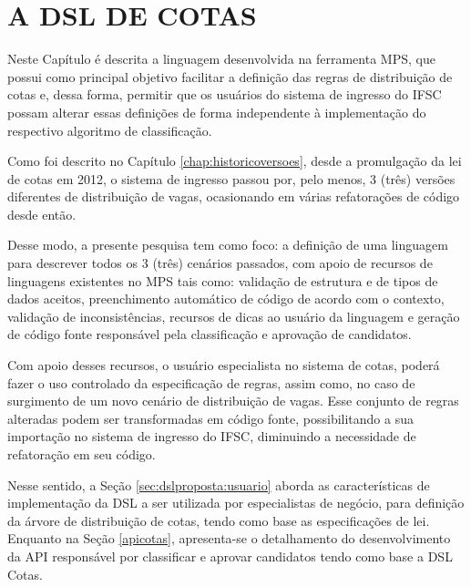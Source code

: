 \chapter{A DSL DE COTAS}
\label{chap:dslcotas}

   Neste Capítulo é descrita a linguagem desenvolvida na ferramenta \gls{MPS}, que possui como principal objetivo facilitar a definição das regras de distribuição de cotas e, dessa forma, permitir que os usuários do sistema de ingresso do \gls{IFSC} possam alterar essas definições de forma independente à implementação do respectivo algoritmo de classificação.
   
   Como foi descrito no Capítulo \ref{chap:historicoversoes}, desde a promulgação da lei de cotas em 2012, o sistema de ingresso passou por, pelo menos, 3 (três) versões diferentes de distribuição de vagas, ocasionando em várias refatorações de código desde então. 
   
   Desse modo, a presente pesquisa tem como foco: a definição de uma linguagem para descrever todos os 3 (três) cenários passados, com apoio de recursos de linguagens existentes no \gls{MPS} tais como: validação de estrutura e de tipos de dados aceitos, preenchimento automático de código de acordo com o contexto, validação de inconsistências, recursos de dicas ao usuário da linguagem e geração de código fonte responsável pela classificação e aprovação de candidatos. 
   
   Com apoio desses recursos, o usuário especialista no sistema de cotas, poderá fazer o uso controlado da especificação de regras, assim como, no caso de surgimento de um novo cenário de distribuição de vagas. Esse conjunto de regras alteradas podem ser transformadas em código fonte, possibilitando a  sua importação no sistema de ingresso do \gls{IFSC}, diminuindo a necessidade de refatoração em seu código.
   
   Nesse sentido, a Seção \ref{sec:dslproposta:usuario} aborda as características de implementação da \gls{DSL} a ser utilizada por especialistas de negócio, para definição da árvore de distribuição de cotas, tendo como base as especificações de lei. Enquanto na Seção \ref{apicotas}, apresenta-se o detalhamento do desenvolvimento da \gls{API} responsável por classificar e aprovar candidatos tendo como base a DSL Cotas.
   
  
   

   
 
